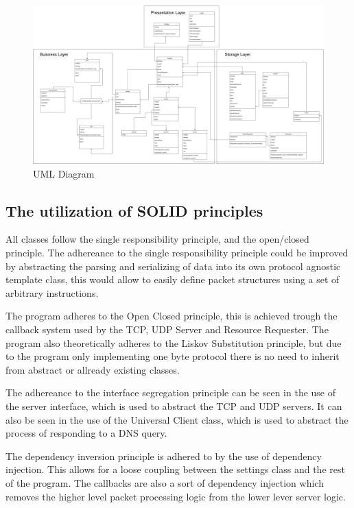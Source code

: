\documentclass[12pt]{article}
\begin{document}
\begin{figure}[h!t]
    \begin{adjustwidth}{-1in}{-1in}
      \includegraphics[width=\linewidth]{uml3.drawio.png}
      \caption{UML Diagram}
      \label{fig:uml}
    \end{adjustwidth}
\end{figure}
\clearpage

\subsection{The utilization of SOLID principles}
All classes follow the single responsibility principle, and the open/closed principle.
The adhereance to the single responsibility principle could be improved by abstracting the parsing and serializing of data into its own
protocol agnostic template class, this would allow to easily define packet structures using a set of arbitrary instructions.

The program adheres to the Open Closed principle, this is achieved trough the callback system used by the TCP, UDP Server and Resource Requester.
The program also theoretically adheres to the Liskov Substitution principle, but due to the program only implementing one byte protocol there is
no need to inherit from abstract or allready existing classes.

The adhereance to the interface segregation principle can be seen in the use of the server interface, which is used to abstract the TCP and UDP servers.
It can also be seen in the use of the Universal Client class, which is used to abstract the process of responding to a DNS query.

The dependency inversion principle is adhered to by the use of dependency injection. This allows for a loose coupling between the settings class
and the rest of the program. The callbacks are also a sort of dependency injection which removes the higher level packet processing logic from the 
lower lever server logic.
\end{document}
